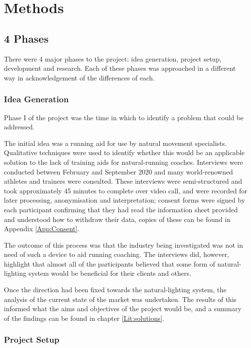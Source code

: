 
\chapter{Methods}

\section{4 Phases}

There were 4 major phases to the project: idea generation, project setup, development and research. Each of these phases was approached in a different way in acknowledgement of the differences of each.

\subsection{Idea Generation}

Phase I of the project was the time in which to identify a problem that could be addressed. 

The initial idea was a running aid for use by natural movement specialists. Qualitative techniques were used to identify whether this would be an applicable solution to the lack of training aids for natural-running coaches. Interviews were conducted between February and September 2020 and many world-renowned athletes and trainers were consulted. These interviews were semi-structured and took approximately 45 minutes to complete over video call, and were recorded for later processing, anonymisation and interpretation; consent forms were signed by each participant confirming that they had read the information sheet provided and understood how to withdraw their data, copies of these can be found in Appendix \ref{App:Consent}.

The outcome of this process was that the industry being investigated was not in need of such a device to aid running coaching. The interviews did, however, highlight that almost all of the participants believed that some form of natural-lighting system would be beneficial for their clients and others.

Once the direction had been fixed towards the natural-lighting system, the analysis of the current state of the market was undertaken. The results of this informed what the aims and objectives of the project would be, and a summary of the findings can be found in chapter \ref{Lit:solutions}.

\subsection{Project Setup}

